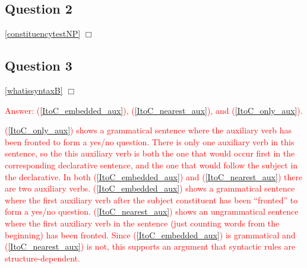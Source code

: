 \documentclass{article}
\begin{document}
\begin{exe}
\end{exe}

\subsection*{Question 2}%
\hfill{} 
\ref{constituencytestNP} $\Box$

\begin{exe}
\end{exe}

\subsection*{Question 3}%
\hfill{} \ref{whatissyntaxB} $\Box$

\begin{exe}
\end{exe}

\textcolor{red}{Answer: (\ref{ItoC_embedded_aux}), (\ref{ItoC_nearest_aux}), and (\ref{ItoC_only_aux}).}

\textcolor{red}{(\ref{ItoC_only_aux}) shows a grammatical sentence where the auxiliary verb has been fronted to form a yes/no question.
There is only one auxiliary verb in this sentence, so the this auxiliary verb is both the one that would occur first in the corresponding declarative sentence, and the one that would follow the subject in the declarative.
In both (\ref{ItoC_embedded_aux}) and (\ref{ItoC_nearest_aux}) there are two auxiliary verbs.
(\ref{ItoC_embedded_aux}) shows a grammatical sentence where the first auxiliary verb after the subject constituent has been “fronted” to form a yes/no question.
(\ref{ItoC_nearest_aux}) shows an ungrammatical sentence where the first auxiliary verb in the sentence (just counting words from the beginning) has been fronted.
Since (\ref{ItoC_embedded_aux}) is grammatical and (\ref{ItoC_nearest_aux}) is not, this supports an argument that syntactic rules are structure-dependent.}
\end{document}
